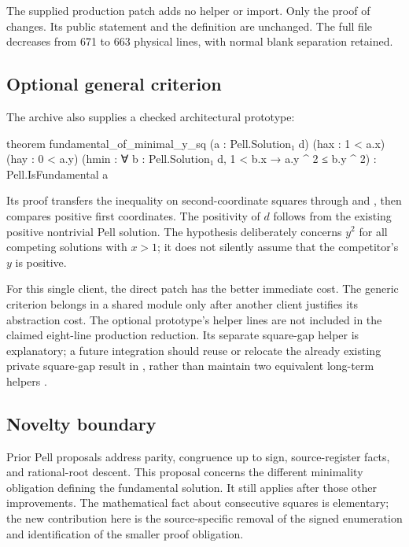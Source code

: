 The supplied production patch adds no helper or import. Only the proof of
 changes. Its public statement and the
 definition are unchanged. The full file decreases from
671 to 663 physical lines, with normal blank separation retained.

\subsection{Optional general criterion}

The archive also supplies a checked architectural prototype:
\begin{lean}
theorem fundamental_of_minimal_y_sq
    (a : Pell.Solution₁ d)
    (hax : 1 < a.x) (hay : 0 < a.y)
    (hmin : ∀ b : Pell.Solution₁ d,
      1 < b.x → a.y ^ 2 ≤ b.y ^ 2) :
    Pell.IsFundamental a
\end{lean}

Its proof transfers the inequality on second-coordinate squares through
 and , then compares positive first
coordinates. The positivity of \(d\) follows from the existing positive
nontrivial Pell solution. The hypothesis deliberately concerns \(y^2\)
for all competing solutions with \(x>1\); it does not silently assume that
the competitor's \(y\) is positive.

For this single client, the direct patch has the better immediate cost.
The generic criterion belongs in a shared module only after another client
justifies its abstraction cost. The optional prototype's helper lines are
not included in the claimed eight-line production reduction. Its separate
square-gap helper is explanatory; a future integration should reuse or
relocate the already existing private square-gap result in
, rather than maintain two equivalent long-term helpers
\cite{minimumnorm}.

\subsection{Novelty boundary}

Prior Pell proposals address parity, congruence up to sign, source-register
facts, and rational-root descent. This proposal concerns the different
minimality obligation defining the fundamental solution. It still applies
after those other improvements. The mathematical fact about consecutive
squares is elementary; the new contribution here is the source-specific
removal of the signed enumeration and identification of the smaller proof
obligation.
